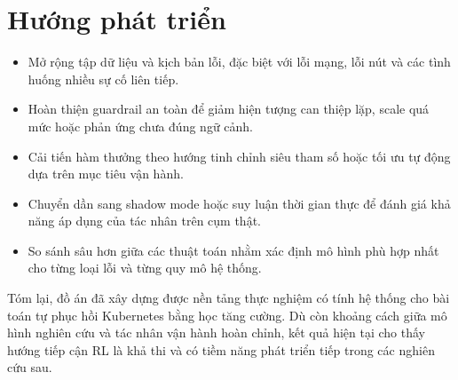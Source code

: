 \section{Hướng phát triển}
\begin{itemize}
    \item Mở rộng tập dữ liệu và kịch bản lỗi, đặc biệt với lỗi mạng, lỗi nút và các 
    tình huống nhiều sự cố liên tiếp.
    \item Hoàn thiện guardrail an toàn để giảm hiện tượng can thiệp lặp, scale quá mức 
    hoặc phản ứng chưa đúng ngữ cảnh.
    \item Cải tiến hàm thưởng theo hướng tinh chỉnh siêu tham số hoặc tối ưu tự động 
    dựa trên mục tiêu vận hành.
    \item Chuyển dần sang shadow mode hoặc suy luận thời gian thực để đánh giá khả năng 
    áp dụng của tác nhân trên cụm thật.
    \item So sánh sâu hơn giữa các thuật toán nhằm xác định mô hình phù hợp nhất cho từng 
    loại lỗi và từng quy mô hệ thống.
\end{itemize}

\noindent Tóm lại, đồ án đã xây dựng được nền tảng thực nghiệm có tính hệ thống cho bài toán 
tự phục hồi Kubernetes bằng học tăng cường. Dù còn khoảng cách giữa mô hình nghiên cứu và 
tác nhân vận hành hoàn chỉnh, kết quả hiện tại cho thấy hướng tiếp cận RL là khả thi và 
có tiềm năng phát triển tiếp trong các nghiên cứu sau.
